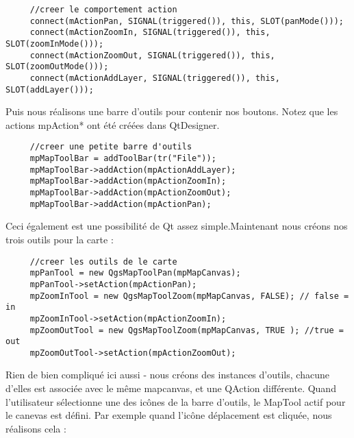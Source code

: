 \begin{verbatim}
     //creer le comportement action
     connect(mActionPan, SIGNAL(triggered()), this, SLOT(panMode()));
     connect(mActionZoomIn, SIGNAL(triggered()), this, SLOT(zoomInMode()));
     connect(mActionZoomOut, SIGNAL(triggered()), this, SLOT(zoomOutMode()));
     connect(mActionAddLayer, SIGNAL(triggered()), this, SLOT(addLayer()));
\end{verbatim}

Puis nous réalisons une barre d'outils pour contenir nos boutons. Notez que les 
actions mpAction* ont été créées dans QtDesigner.

\begin{verbatim}
     //creer une petite barre d'outils
     mpMapToolBar = addToolBar(tr("File"));
     mpMapToolBar->addAction(mpActionAddLayer);
     mpMapToolBar->addAction(mpActionZoomIn);
     mpMapToolBar->addAction(mpActionZoomOut);
     mpMapToolBar->addAction(mpActionPan);
\end{verbatim}

Ceci également est une possibilité de Qt assez simple.Maintenant nous créons 
nos trois outils pour la carte :

\begin{verbatim}
     //creer les outils de le carte
     mpPanTool = new QgsMapToolPan(mpMapCanvas);
     mpPanTool->setAction(mpActionPan);
     mpZoomInTool = new QgsMapToolZoom(mpMapCanvas, FALSE); // false = in
     mpZoomInTool->setAction(mpActionZoomIn);
     mpZoomOutTool = new QgsMapToolZoom(mpMapCanvas, TRUE ); //true = out
     mpZoomOutTool->setAction(mpActionZoomOut);
\end{verbatim}

Rien de bien compliqué ici aussi - nous créons des instances d'outils, chacune 
d'elles est associée avec le même mapcanvas, et une QAction différente. Quand 
l'utilisateur sélectionne une des icônes de la barre d'outils, le MapTool actif 
pour le canevas est défini. Par exemple quand l'icône déplacement est cliquée, 
nous réalisons cela :

